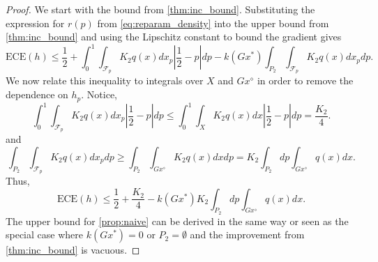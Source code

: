 \documentclass[10pt,a4paper]{amsart}
\newcommand{\ECE}{\mathrm{ECE}(h)}
\begin{document}
\begin{proof}
We start with the bound from \cref{thm:inc_bound}. Substituting the expression for $r(p)$ from  \cref{eq:reparam_density} into the upper bound from \cref{thm:inc_bound} and using the Lipschitz constant to bound the gradient gives $$\ECE \leq \frac{1}{2} + \int_0^{1}\int_{\mathcal{F}_p}K_2q(x)dx_p\left|\frac{1}{2} - p\right|dp  - k(Gx^*)\int_{P_2}\int_{\mathcal{F}_p}K_2q(x)dx_pdp.$$ We now relate this inequality to integrals over $X$ and $Gx^\diamond$ in order to remove the dependence on $h_p$. Notice,
%
\begin{equation*}
\int_0^{1}\int_{\mathcal{F}_p}K_2q(x)dx_p\left|\frac{1}{2} - p\right|dp \leq  \int_0^{1}\int_{X}K_2q(x)dx\left|\frac{1}{2} - p\right|dp =  \frac{K_2}{4}.
\end{equation*}
%
and
\begin{equation*}
 \int_{P_2}\int_{\mathcal{F}_p}K_2q(x)dx_pdp \geq 
  \int_{P_2}\int_{Gx^\diamond} K_2q(x)dxdp =
  K_2\int_{P_2}dp\int_{Gx^\diamond}q(x)dx. 
\end{equation*}
Thus, $$\ECE \leq \frac{1}{2} + \frac{K_2}{4} - k(Gx^*)K_2\int_{P_2}dp\int_{Gx^\diamond}q(x)dx.$$ The upper bound for \cref{prop:naive} can be derived in the same way or seen as the special case where $k(Gx^*) = 0$ or $P_2 = \emptyset$ and the improvement from \cref{thm:inc_bound} is vacuous.
\end{proof}
\end{document}

